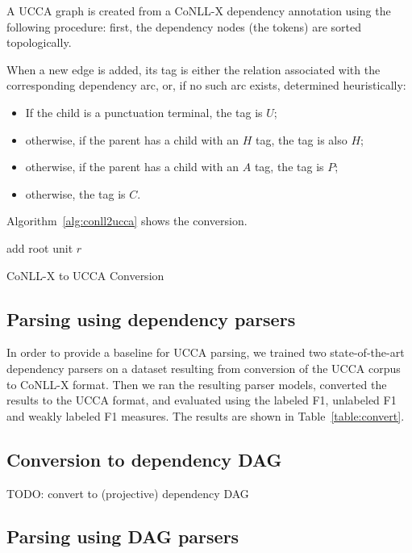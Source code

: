 \documentclass[11pt]{article}
\begin{document}
A UCCA graph is created from a CoNLL-X dependency annotation using the following procedure: first, the dependency nodes (the tokens) are sorted topologically.

When a new edge is added, its tag is either the relation associated with the corresponding dependency arc, or, if no such arc exists, determined heuristically:
\begin{itemize}
\item If the child is a punctuation terminal, the tag is $U$;
\item otherwise, if the parent has a child with an $H$ tag, the tag is also $H$;
\item otherwise, if the parent has a child with an $A$ tag, the tag is $P$;
\item otherwise, the tag is $C$.
\end{itemize}

Algorithm~\ref{alg:conll2ucca} shows the conversion.

\begin{algorithm}
 add root unit $r$\;
 \caption{CoNLL-X to UCCA Conversion}
 \label{alg:conll2ucca}
\end{algorithm}

\subsection{Parsing using dependency parsers}

In order to provide a baseline for UCCA parsing, we trained two state-of-the-art dependency parsers on a dataset resulting from conversion of the UCCA corpus to CoNLL-X format. Then we ran the resulting parser models, converted the results to the UCCA format, and evaluated using the labeled F1, unlabeled F1 and weakly labeled F1 measures. The results are shown in Table~\ref{table:convert}.

\subsection{Conversion to dependency DAG}

TODO: convert to (projective) dependency DAG

\subsection{Parsing using DAG parsers}
\end{document}
